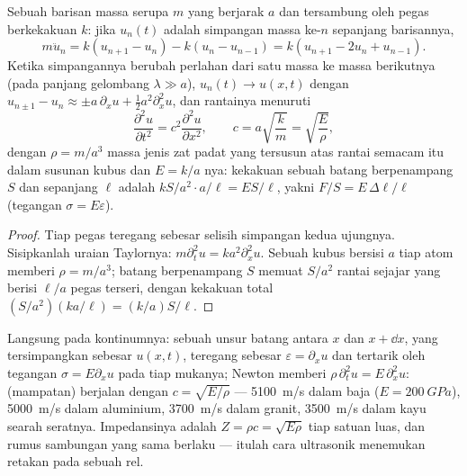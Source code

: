 \begin{proposition}\label{prop:b2:waves-on-strings:chain}
Sebuah barisan massa serupa $m$ yang berjarak $a$ dan tersambung oleh pegas
berkekakuan $k$: jika $u_n(t)$ adalah simpangan massa ke-$n$ sepanjang
barisannya,
\[
m\ddot u_n = k(u_{n+1} - u_n) - k(u_n - u_{n-1}) = k(u_{n+1} - 2u_n + u_{n-1}) .
\]
Ketika simpangannya berubah perlahan dari satu massa ke massa berikutnya (pada
panjang gelombang $\lambda \gg a$), $u_n(t) \to u(x, t)$ dengan $u_{n\pm1} - u_n \approx
\pm a\,\partial_xu + \tfrac12a^2\partial_x^2u$, dan rantainya menuruti 
\[
\frac{\partial^2u}{\partial t^2} = c^2\frac{\partial^2u}{\partial x^2} , \qquad
c = a\sqrt{\frac km} = \sqrt{\frac{E}{\rho}} ,
\]
dengan $\rho = m/a^3$ massa jenis zat padat yang tersusun atas rantai semacam itu dalam
susunan kubus dan $E = k/a$ \emph{}nya: kekakuan
sebuah batang berpenampang $S$ dan sepanjang $\ell$ adalah $kS/a^2\cdot a/\ell = ES/\ell$,
yakni \emph{} $F/S = E\,\Delta\ell/\ell$ (tegangan $\sigma = E\varepsilon$).
\end{proposition}

\begin{proof}
Tiap pegas teregang sebesar selisih simpangan kedua
ujungnya. Sisipkanlah uraian Taylornya: $m\partial_t^2u = ka^2\partial_x^2u$. Sebuah kubus
bersisi $a$ tiap atom memberi $\rho = m/a^3$; batang berpenampang $S$ memuat
$S/a^2$ rantai sejajar yang berisi $\ell/a$ pegas terseri, dengan kekakuan total
$(S/a^2)(ka/\ell) = (k/a)S/\ell$.
\end{proof}

\begin{proposition}\label{prop:b2:waves-on-strings:rod}
Langsung pada kontinumnya: sebuah unsur batang antara $x$ dan $x +
\dd x$, yang tersimpangkan sebesar $u(x, t)$, teregang sebesar $\varepsilon = \partial_xu$ dan tertarik
oleh tegangan $\sigma = E\partial_xu$ pada tiap mukanya; Newton memberi $\rho\,\partial_t^2u =
E\,\partial_x^2u$:  (mampatan) berjalan dengan $c = \sqrt{E/\rho}$
--- \qty{5100}{m/s} dalam baja ($E = \qty{200}{GPa}$), \qty{5000}{m/s} dalam aluminium,
\qty{3700}{m/s} dalam granit, \qty{3500}{m/s} dalam kayu searah seratnya.
Impedansinya adalah $Z = \rho c = \sqrt{E\rho}$ tiap satuan luas, dan rumus
sambungan yang sama berlaku --- itulah cara ultrasonik menemukan retakan pada
sebuah rel.
\end{proposition}

